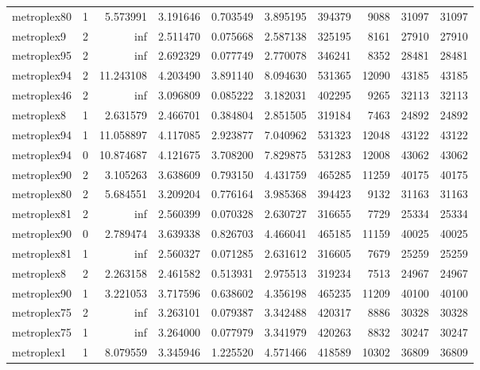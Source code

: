 \begin{longtable}{|l|r|r|r|r|r|r|r|r|r|}
metroplex80 & 1 & 5.573991 & 3.191646 & 0.703549 & 3.895195 & 394379 & 9088 & 31097 & 31097 \\
metroplex9 & 2 & inf & 2.511470 & 0.075668 & 2.587138 & 325195 & 8161 & 27910 & 27910 \\
metroplex95 & 2 & inf & 2.692329 & 0.077749 & 2.770078 & 346241 & 8352 & 28481 & 28481 \\
metroplex94 & 2 & 11.243108 & 4.203490 & 3.891140 & 8.094630 & 531365 & 12090 & 43185 & 43185 \\
metroplex46 & 2 & inf & 3.096809 & 0.085222 & 3.182031 & 402295 & 9265 & 32113 & 32113 \\
metroplex8 & 1 & 2.631579 & 2.466701 & 0.384804 & 2.851505 & 319184 & 7463 & 24892 & 24892 \\
metroplex94 & 1 & 11.058897 & 4.117085 & 2.923877 & 7.040962 & 531323 & 12048 & 43122 & 43122 \\
metroplex94 & 0 & 10.874687 & 4.121675 & 3.708200 & 7.829875 & 531283 & 12008 & 43062 & 43062 \\
metroplex90 & 2 & 3.105263 & 3.638609 & 0.793150 & 4.431759 & 465285 & 11259 & 40175 & 40175 \\
metroplex80 & 2 & 5.684551 & 3.209204 & 0.776164 & 3.985368 & 394423 & 9132 & 31163 & 31163 \\
metroplex81 & 2 & inf & 2.560399 & 0.070328 & 2.630727 & 316655 & 7729 & 25334 & 25334 \\
metroplex90 & 0 & 2.789474 & 3.639338 & 0.826703 & 4.466041 & 465185 & 11159 & 40025 & 40025 \\
metroplex81 & 1 & inf & 2.560327 & 0.071285 & 2.631612 & 316605 & 7679 & 25259 & 25259 \\
metroplex8 & 2 & 2.263158 & 2.461582 & 0.513931 & 2.975513 & 319234 & 7513 & 24967 & 24967 \\
metroplex90 & 1 & 3.221053 & 3.717596 & 0.638602 & 4.356198 & 465235 & 11209 & 40100 & 40100 \\
metroplex75 & 2 & inf & 3.263101 & 0.079387 & 3.342488 & 420317 & 8886 & 30328 & 30328 \\
metroplex75 & 1 & inf & 3.264000 & 0.077979 & 3.341979 & 420263 & 8832 & 30247 & 30247 \\
metroplex1 & 1 & 8.079559 & 3.345946 & 1.225520 & 4.571466 & 418589 & 10302 & 36809 & 36809 \\
\end{longtable}
